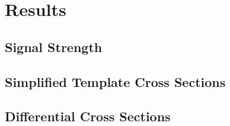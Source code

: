 \section{Results}

\subsection{Signal Strength}
\label{sec:sign}
 

\clearpage 

\subsection{Simplified Template Cross Sections}
\label{sec:stxs}
 

\subsection{Differential Cross Sections}
\label{sec:diff_xsec}
 
